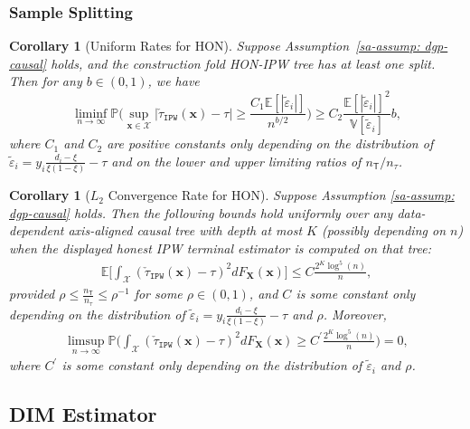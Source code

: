 \documentclass[10pt]{article}
\def\treeT{\mathsf{T}}
\def\bx{\mathbf{x}}
\def\bX{\mathbf{X}}
\def\X{\mathcal{X}}
\def\E{\mathbb{E}}
\def\P{\mathbb{P}}
\def\V{\mathbb{V}}
\newtheorem{coro}[theorem]{Corollary}
\theoremstyle{definition}
\theoremstyle{remark}
\begin{document}
\subsubsection{Sample Splitting}

\begin{coro}[Uniform Rates for HON]\label{sa-coro: honest output ipw}
Suppose Assumption~\ref{sa-assump: dgp-causal} holds, and the construction fold HON-IPW tree has at least one split. Then for any $b \in (0, 1) $, we have
\begin{equation*}
    \liminf_{n\to\infty} \mathbb{P}\Bigg(\sup_{\bx\in\mathcal{X}}|\check\tau_{\mathtt{IPW}}(\bx) - \tau| \geq \frac{C_1\E[|\tilde{\varepsilon}_i|]}{n^{b/2}}\Bigg) \geq C_2  \frac{\E[|\tilde{\varepsilon}_i|]^2}{\V[\tilde{\varepsilon}_i]} b,
\end{equation*}
where $C_1$ and $C_2$ are positive constants only depending on the distribution
of $\tilde{\varepsilon}_i = y_i \frac{d_i - \xi}{\xi(1 - \xi)} - \tau$
and on the lower and upper limiting ratios of $n_{\treeT}/n_{\tau}$.
\end{coro}



\begin{coro}[$L_2$ Convergence Rate for HON]\label{sa-coro: L2 consistency honest ipw}
Suppose Assumption \ref{sa-assump: dgp-causal} holds. Then the following bounds hold uniformly over any data-dependent axis-aligned causal tree with depth at most $K$ (possibly depending on $n$) when the displayed honest IPW terminal estimator is computed on that tree:
\begin{align*}
    \E \bigg[ \int_{\X} (\check\tau_{\mathtt{IPW}}(\bx) - \tau)^2 dF_{\bX}(\bx)\bigg] \leq C \frac{2^K \log^5(n)}{n},
\end{align*}
provided $\rho \leq \frac{n_{\treeT}}{n_{\tau}} \leq \rho^{-1}$ for some $\rho \in (0,1)$, and $C$ is some constant only depending on the distribution of $\tilde{\varepsilon}_i = y_i \frac{d_i - \xi}{\xi(1 - \xi)} - \tau$ and $\rho$. Moreover, 
\begin{align*}
    \limsup_{n \to \infty} \P \bigg( \int_{\X} (\check\tau_{\mathtt{IPW}}(\bx) - \tau)^2 dF_{\bX}(\bx) \geq C^{\prime} \frac{2^K \log^5(n)}{n} \bigg) = 0,
\end{align*}
where $C^{\prime}$ is some constant only depending on the distribution of $\tilde{\varepsilon}_i$ and $\rho$. 
\end{coro}

\subsection{DIM Estimator}\label{sa-sec: reg causal}
\end{document}
